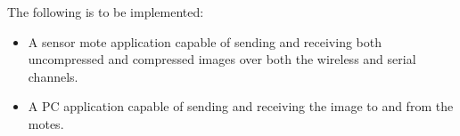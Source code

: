 The following is to be implemented:
\begin{itemize}
\item A sensor mote application capable of sending and receiving both uncompressed and compressed images over both the wireless and serial channels.
\item A PC application capable of sending and receiving the image to and from the motes.
\end{itemize} 

 

